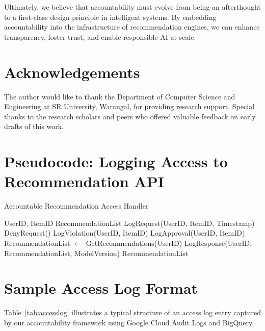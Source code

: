 \documentclass[acmsmall]{acmart}
\begin{document}
Ultimately, we believe that accountability must evolve from being an afterthought to a first-class design principle in intelligent systems. By embedding accountability into the infrastructure of recommendation engines, we can enhance transparency, foster trust, and enable responsible AI at scale.

\section*{Acknowledgements}

The author would like to thank the Department of Computer Science and Engineering at SR University, Warangal, for providing research support. Special thanks to the research scholars and peers who offered valuable feedback on early drafts of this work.

\section{}
\appendix


\section{Pseudocode: Logging Access to Recommendation API}
\label{sec:pseudocode}

\begin{algorithm}[H]
\caption{Accountable Recommendation Access Handler}
\begin{algorithmic}[1]
\Require UserID, ItemID
\Ensure RecommendationList
\State LogRequest(UserID, ItemID, Timestamp)
        \State DenyRequest()
        \State LogViolation(UserID, ItemID)
    \Else
        \State LogApproval(UserID, ItemID)
    \EndIf
\EndIf
\EndIf
\State RecommendationList $\gets$ GetRecommendations(UserID)
\State LogResponse(UserID, RecommendationList, ModelVersion)
\State \Return RecommendationList
\end{algorithmic}
\end{algorithm}

\section{Sample Access Log Format}

Table~\ref{tab:accesslog} illustrates a typical structure of an access log entry captured by our accountability framework using Google Cloud Audit Logs and BigQuery.
\end{document}

